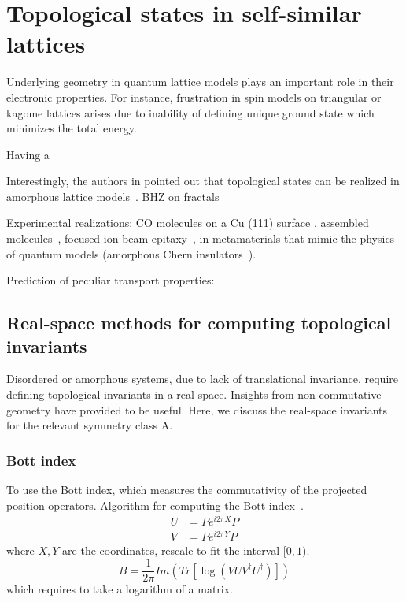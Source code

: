 \chapter{Topological states in self-similar lattices}
\label{ch:fractals}
Underlying geometry in quantum lattice models plays an important role in their electronic properties. For instance, frustration in spin models on triangular or kagome lattices arises due to inability of defining unique ground state which minimizes the total energy.


 Having a 

Interestingly, the authors in pointed out that topological states can be realized in amorphous lattice models~\cite{AmorphTIShenoy2017}. BHZ on fractals~\cite{2018:BHZ}






Experimental realizations: CO molecules on a Cu (111) surface \cite{Kempkes2019}, assembled molecules~\cite{Shang2015}, focused ion beam epitaxy~\cite{FIBSC}, in metamaterials that mimic the physics of quantum models (amorphous Chern insulators~\cite{Gyrosc2018Irvine}).



Prediction of peculiar transport properties: \cite{2016:TomadinTransport1, 2017:YuanOptCond}


\section{Real-space methods for computing topological invariants}
Disordered or amorphous systems, due to lack of translational invariance, require defining topological invariants in a real space. Insights from non-commutative geometry have provided to be useful. Here, we discuss the real-space invariants for the relevant symmetry class A.
\subsection*{Bott index}
To use the Bott index, which measures the commutativity of the projected position operators. Algorithm for computing the Bott index~\cite{BottIdx}.
\begin{equation}
\begin{aligned}
U &= P e^{i 2 \pi X} P \\ 
V &= P e^{i 2 \pi Y} P
\end{aligned}
\end{equation}
where $X, Y$ are the coordinates, rescale to fit the interval $[0, 1)$.
\begin{equation}
B = \frac{1}{2 \pi} Im \left( Tr [ \log (V U V^{\dagger} U^{\dagger} ) ] \right)
\end{equation}
which requires to take a logarithm of a matrix.
